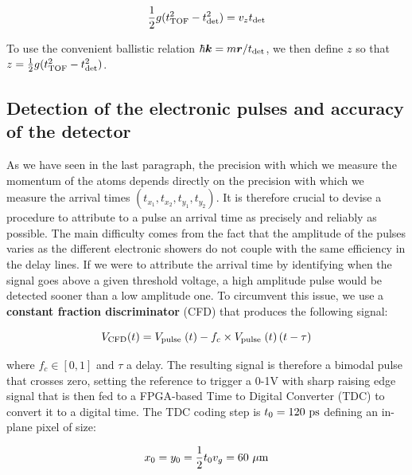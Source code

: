 \begin{equation}
    \frac{1}{2} g(t_{\rm{TOF}}^2-t_{\rm{det}}^2) = v_z t_{\rm{det}}
\end{equation}

\noindent To use the convenient ballistic relation $\hbar \bm{k} = m \bm{r}/t_{\rm{det}}$, we then define $z$ so that $z=\frac{1}{2} g(t_{\rm{TOF}}^2-t_{\rm{det}}^2)$.

\subsection{Detection of the electronic pulses and accuracy of the detector}

As we have seen in the last paragraph, the precision with which we measure the momentum of the atoms depends directly on the precision with which we measure the arrival times $(t_{x_1},t_{x_2},t_{y_1},t_{y_2})$. It is therefore crucial to devise a procedure to attribute to a pulse an arrival time as precisely and reliably as possible. The main difficulty comes from the fact that the amplitude of the pulses varies as the different electronic showers do not couple with the same efficiency in the delay lines. If we were to attribute the arrival time by identifying when the signal goes above a given threshold voltage, a high amplitude pulse would be detected sooner than a low amplitude one. To circumvent this issue, we use a \textbf{constant fraction discriminator} (CFD) that produces the following signal:

\begin{equation}
    V_{\rm{CFD}}(t)=V_{\text {pulse }}(t)-f_{c} \times V_{\text {pulse }}(t)\left(t-\tau\right)
\end{equation}

\noindent where $f_c \in [0,1]$ and $\tau$ a delay. The resulting signal is therefore a bimodal pulse that crosses zero, setting the reference to trigger a 0-1V with sharp raising edge signal that is then fed to a FPGA-based Time to Digital Converter (TDC) to convert it to a digital time. The TDC coding step is $t_0 = 120 \ \rm{ps}$ defining an in-plane pixel of size:

\begin{equation}
    x_0 = y_0 = \frac{1}{2} t_0 v_g = 60 \ \mu \rm{m}
\end{equation}

